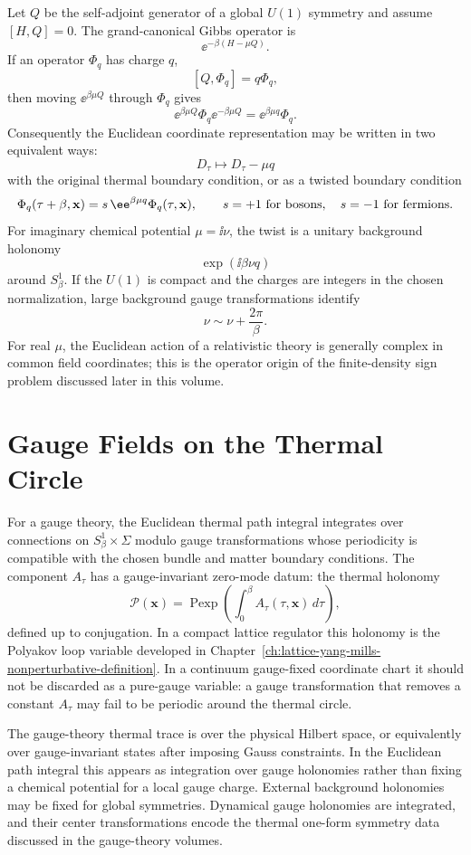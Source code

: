 Let \(Q\) be the self-adjoint generator of a global \(U(1)\) symmetry and
assume \([H,Q]=0\).  The grand-canonical Gibbs operator is
\[
  \ee^{-\beta(H-\mu Q)} .
\]
If an operator \(\Phi_q\) has charge \(q\),
\[
  [Q,\Phi_q]=q\Phi_q,
\]
then moving \(\ee^{\beta\mu Q}\) through \(\Phi_q\) gives
\[
  \ee^{\beta\mu Q}\Phi_q\ee^{-\beta\mu Q}
  =
  \ee^{\beta\mu q}\Phi_q .
\]
Consequently the Euclidean coordinate representation may be written in two
equivalent ways:
\[
  D_\tau\longmapsto D_\tau-\mu q
\]
with the original thermal boundary condition, or as a twisted boundary
condition
\[
  \Phi_q(\tau+\beta,\mathbf x)
  =
  s\,\ee^{\beta\mu q}\Phi_q(\tau,\mathbf x),
  \qquad s=+1\ \hbox{for bosons},\quad s=-1\ \hbox{for fermions}.
\]
For imaginary chemical potential \(\mu=\ii\nu\), the twist is a unitary
background holonomy
\[
  \exp(\ii\beta\nu q)
\]
around \(S^1_\beta\).  If the \(U(1)\) is compact and the charges are
integers in the chosen normalization, large background gauge transformations
identify
\[
  \nu\sim \nu+\frac{2\pi}{\beta}.
\]
For real \(\mu\), the Euclidean action of a relativistic theory is generally
complex in common field coordinates; this is the operator origin of the
finite-density sign problem discussed later in this volume.

\section{Gauge Fields on the Thermal Circle}

For a gauge theory, the Euclidean thermal path integral integrates over
connections on \(S^1_\beta\times\Sigma\) modulo gauge transformations whose
periodicity is compatible with the chosen bundle and matter boundary
conditions.  The component \(A_\tau\) has a gauge-invariant zero-mode datum:
the thermal holonomy
\[
  \mathcal P(\mathbf x)
  =
  \operatorname{Pexp}
  \left(\int_0^\beta A_\tau(\tau,\mathbf x)\,d\tau\right),
\]
defined up to conjugation.  In a compact lattice regulator this holonomy is
the Polyakov loop variable developed in
Chapter~\ref{ch:lattice-yang-mills-nonperturbative-definition}.  In a
continuum gauge-fixed coordinate chart it should not be discarded as a
pure-gauge variable: a gauge transformation that removes a constant
\(A_\tau\) may fail to be periodic around the thermal circle.

The gauge-theory thermal trace is over the physical Hilbert space, or
equivalently over gauge-invariant states after imposing Gauss constraints.
In the Euclidean path integral this appears as integration over gauge
holonomies rather than fixing a chemical potential for a local gauge charge.
External background holonomies may be fixed for global symmetries.  Dynamical
gauge holonomies are integrated, and their center transformations encode the
thermal one-form symmetry data discussed in the gauge-theory volumes.

